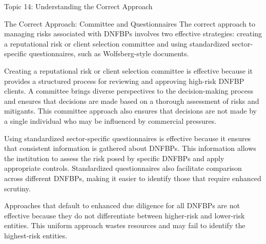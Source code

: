 \documentclass[5pt]{beamer}
\begin{document}
	\begin{frame}{Topic 14: Understanding the Correct Approach}
		\begin{block}{\tiny The Correct Approach: Committee and Questionnaires}
			\tiny The correct approach to managing risks associated with DNFBPs involves two effective strategies: creating a reputational risk or client selection committee and using standardized sector-specific questionnaires, such as Wolfsberg-style documents.
			
			Creating a reputational risk or client selection committee is effective because it provides a structured process for reviewing and approving high-risk DNFBP clients. A committee brings diverse perspectives to the decision-making process and ensures that decisions are made based on a thorough assessment of risks and mitigants. This committee approach also ensures that decisions are not made by a single individual who may be influenced by commercial pressures.
			
			Using standardized sector-specific questionnaires is effective because it ensures that consistent information is gathered about DNFBPs. This information allows the institution to assess the risk posed by specific DNFBPs and apply appropriate controls. Standardized questionnaires also facilitate comparison across different DNFBPs, making it easier to identify those that require enhanced scrutiny.
			
			Approaches that default to enhanced due diligence for all DNFBPs are not effective because they do not differentiate between higher-risk and lower-risk entities. This uniform approach wastes resources and may fail to identify the highest-risk entities.
		\end{block}
	\end{frame}
	
\end{document}
